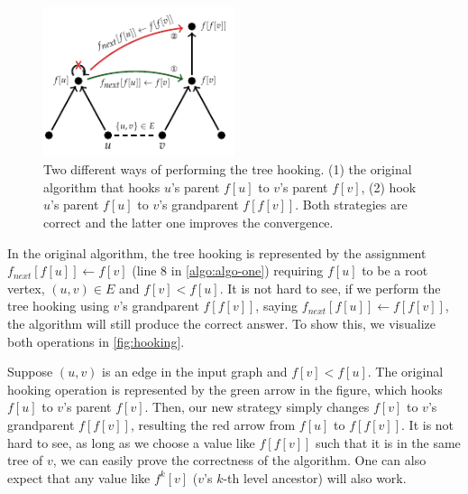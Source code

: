 \documentclass{sokendai_thesis} %
\begin{document}
\begin{figure}[t]
\centering
\includegraphics[width=0.5\textwidth]{figures/hooking.pdf}
\vspace{-10pt}
\caption{Two different ways of performing the tree hooking. (1) the original algorithm that hooks $u$'s parent $f[u]$ to $v$'s parent $f[v]$, (2) hook $u$'s parent $f[u]$ to $v$'s grandparent $f[f[v]]$. Both strategies are correct and the latter one improves the convergence.}
\vspace{-10pt}
\label{fig:hooking}
\end{figure}

In the original algorithm, the tree hooking is represented by the assignment $f_{\mathit{next}}[f[u]]\leftarrow f[v]$ (line 8 in \autoref{algo:algo-one}) requiring $f[u]$ to be a root vertex, $(u,v)\in E$ and $f[v]<f[u]$.
It is not hard to see, if we perform the tree hooking using $v$'s grandparent $f[f[v]]$, saying $f_{\mathit{next}}[f[u]]\leftarrow f[f[v]]$, the algorithm will still produce the correct answer.
To show this, we visualize both operations in \autoref{fig:hooking}.

Suppose $(u,v)$ is an edge in the input graph and $f[v]<f[u]$.
The original hooking operation is represented by the green arrow in the figure, which hooks $f[u]$ to $v$'s parent $f[v]$.
Then, our new strategy simply changes $f[v]$ to $v$'s grandparent $f[f[v]]$, resulting the red arrow from $f[u]$ to $f[f[v]]$.
It is not hard to see, as long as we choose a value like $f[f[v]]$ such that it is in the same tree of $v$, we can easily prove the correctness of the algorithm.
One can also expect that any value like $f^{k}[v]$ ($v$'s $k$-th level ancestor) will also work.
\end{document}
